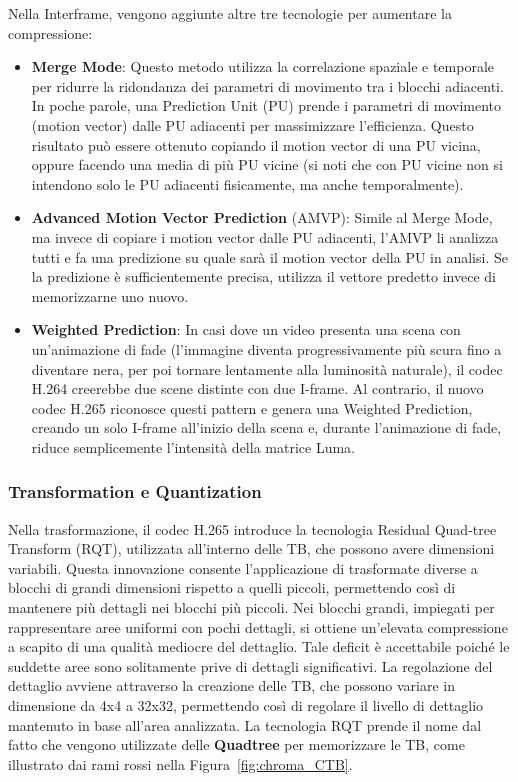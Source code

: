 \documentclass[a4paper,12pt, oneside]{article}
\begin{document}
Nella Interframe, vengono aggiunte altre tre tecnologie per aumentare la compressione:

\begin{itemize}
    \item \textbf{Merge Mode}: Questo metodo utilizza la correlazione spaziale e temporale per ridurre la
    ridondanza dei parametri di movimento tra i blocchi adiacenti. In poche parole, una Prediction Unit
    (PU) prende i parametri di movimento (motion vector) dalle PU adiacenti per massimizzare l'efficienza.
    Questo risultato può essere ottenuto copiando il motion vector di una PU vicina, oppure facendo una
    media di più PU vicine (si noti che con PU vicine non si intendono solo le PU adiacenti fisicamente, ma
    anche temporalmente).
    \item \textbf{Advanced Motion Vector Prediction} (AMVP): Simile al Merge Mode, ma invece di copiare i
    motion vector dalle PU adiacenti, l'AMVP li analizza tutti e fa una predizione su quale sarà il motion
    vector della PU in analisi. Se la predizione è sufficientemente precisa, utilizza il vettore predetto
    invece di memorizzarne uno nuovo.
    \item \textbf{Weighted Prediction}: In casi dove un video presenta una scena con un'animazione di fade
    (l'immagine diventa progressivamente più scura fino a diventare nera, per poi tornare lentamente alla
    luminosità naturale), il codec H.264 creerebbe due scene distinte con due I-frame. Al contrario, il
    nuovo codec H.265 riconosce questi pattern e genera una Weighted Prediction, creando un solo I-frame
    all'inizio della scena e, durante l'animazione di fade, riduce semplicemente l'intensità della matrice
    Luma.
\end{itemize}

\subsubsection{Transformation e Quantization}
Nella trasformazione, il codec H.265 introduce la tecnologia Residual Quad-tree Transform (RQT), utilizzata
all'interno delle TB, che possono avere dimensioni variabili. Questa innovazione consente l'applicazione di
trasformate diverse a blocchi di grandi dimensioni rispetto a quelli piccoli, permettendo così di mantenere
più dettagli nei blocchi più piccoli. Nei blocchi grandi, impiegati per rappresentare aree uniformi con
pochi dettagli, si ottiene un'elevata compressione a scapito di una qualità mediocre del dettaglio. Tale
deficit è accettabile poiché le suddette aree sono solitamente prive di dettagli significativi. La
regolazione del dettaglio avviene attraverso la creazione delle TB, che possono variare in dimensione
da 4x4 a 32x32, permettendo così di regolare il livello di dettaglio mantenuto in base all'area analizzata.
La tecnologia RQT prende il nome dal fatto che vengono utilizzate delle \textbf{Quadtree} per memorizzare
le TB, come illustrato dai rami rossi nella Figura~\ref{fig:chroma_CTB}.
\end{document}

